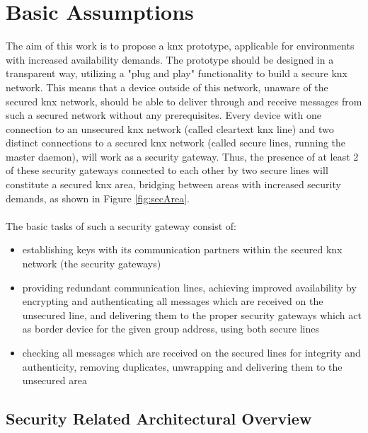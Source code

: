 \section{Basic Assumptions}

The aim of this work is to propose a \gls{knx} prototype, applicable for environments with increased availability demands.
The prototype should be designed in a transparent way, utilizing a "plug and play" functionality to build a secure \gls{knx} network.
This means that a device outside of this network, unaware of
the secured \gls{knx} network, should be able to deliver through and receive messages from such a secured network without any prerequisites. 
Every device with one connection to an unsecured \gls{knx} network (called cleartext \gls{knx} line) and two distinct connections to a secured \gls{knx}
network (called secure lines, running the master daemon), will work
as a security gateway. Thus, the presence of at least 2 of these security gateways connected to each other by two secure lines will constitute a 
secured \gls{knx} area, bridging between areas with increased security demands, as shown in Figure \ref{fig:secArea}.
\\
\\
The basic tasks of such a security gateway consist of:
\begin{itemize}
 \item establishing keys with its communication partners within the secured \gls{knx} network (the security gateways)
 \item providing redundant communication lines, achieving improved availability by encrypting and authenticating all messages which are received on the unsecured line, and delivering them to the proper security gateways which act as
 border device for the given group address, using both secure lines
 \item checking all messages which are received on the secured lines for integrity and authenticity, removing duplicates, unwrapping and delivering them to
 the unsecured area
\end{itemize}

\subsection{Security Related Architectural Overview}

